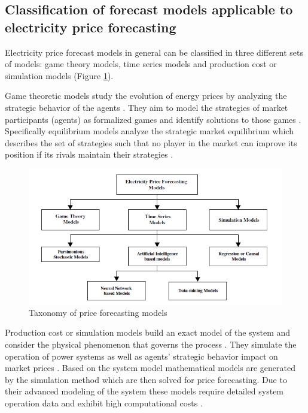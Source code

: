 \subsection{Classification of forecast models applicable to electricity price forecasting}

Electricity price forecast models in general can be classified in three different sets of models: game theory models, time series models and production cost or simulation models \cite{gonzalez2005modeling, aggarwal2009electricity} (Figure \ref{fig:classification_of_price_forecasting_models}).  

Game theoretic models study the evolution of energy prices by analyzing the strategic behavior of the agents \cite{gonzalez2005modeling}. They aim to model the strategies of market participants (agents) as formalized games and identify solutions to those games \cite{aggarwal2009electricity}. Specifically equilibrium models analyze the strategic market equilibrium which describes the set of strategies such that no player in the market can improve its position if its rivals maintain their strategies \cite{gonzalez2005modeling}. 

\begin{figure}[htbp]
	\centering
		\includegraphics{figures/state_of_the_art/classification_of_price_forecasting_models.PNG}
	\caption{Taxonomy of price forecasting models \cite{aggarwal2009electricity}}
	\label{fig:classification_of_price_forecasting_models}
\end{figure}

Production cost or simulation models build an exact model of the system and consider the physical phenomenon that governs the process \cite{aggarwal2009electricity}. 
They simulate the operation of power systems as well as agents' strategic behavior impact on market prices \cite{gonzalez2005modeling,lora2007electricity}. Based on the system model mathematical models are generated by the simulation method which are then solved for price forecasting. 
Due to their advanced modeling of the system these models require detailed system operation data and exhibit high computational costs \cite{aggarwal2009electricity}. 

